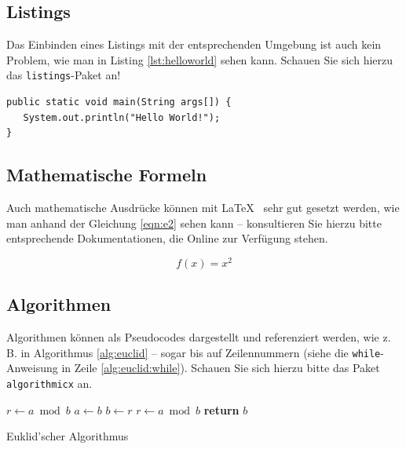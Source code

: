 \subsection{Listings}

Das Einbinden eines Listings mit der entsprechenden Umgebung ist auch kein Problem, wie man in Listing \vref{lst:helloworld} sehen kann. Schauen Sie sich hierzu das \texttt{listings}-Paket an!

		\newpage


\lstset{language=Java}
\begin{lstlisting}[caption={Hello World!}, label={lst:helloworld}]
public static void main(String args[]) {
   System.out.println("Hello World!");
}
\end{lstlisting}


\subsection{Mathematische Formeln}
Auch mathematische Ausdrücke können mit \LaTeX~ sehr gut gesetzt werden, wie man anhand der Gleichung \vref{eqn:e2} sehen kann -- konsultieren Sie hierzu bitte entsprechende Dokumentationen, die Online zur Verfügung stehen.

\begin{equation}
f(x)=x^2
\label{eqn:e2}
\end{equation}


\subsection{Algorithmen}
Algorithmen können als Pseudocodes dargestellt und referenziert werden, wie z.\,B. in Algorithmus \vref{alg:euclid} -- sogar bis auf Zeilennummern
(siehe die \texttt{while}-Anweisung in Zeile \vref{alg:euclid:while}). Schauen Sie sich hierzu bitte das Paket \texttt{algorithmicx} an.



\begin{algorithm}
\begin{algorithmic}[1]
   \State $r\gets a\bmod b$
    \label{alg:euclid:while}
      \State $a\gets b$
      \State $b\gets r$
      \State $r\gets a\bmod b$
   \EndWhile\label{euclidendwhile}
   \State \textbf{return} $b$
\EndProcedure
\end{algorithmic}
\caption{Euklid'scher Algorithmus}\label{alg:euclid}
\end{algorithm}


